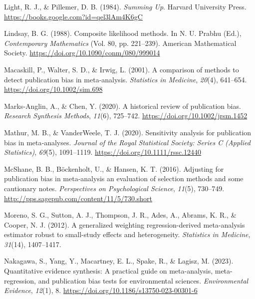 \documentclass[
  american,
  man, donotrepeattitle,floatsintext]{apa7}
\newlength{\cslhangindent}
\newenvironment{CSLReferences}[2] %
 {\begin{list}{}{%
  \setlength{\itemindent}{0pt}
  \setlength{\leftmargin}{0pt}
  \setlength{\parsep}{0pt}
  \ifodd #1
   \setlength{\leftmargin}{\cslhangindent}
   \setlength{\itemindent}{-1\cslhangindent}
  \fi
  \setlength{\itemsep}{#2\baselineskip}}}
 {\end{list}}
\begin{document}
\begin{CSLReferences}{1}{0}
Light, R. J., \& Pillemer, D. B. (1984). \emph{Summing {Up}}. {Harvard University Press}. \url{https://books.google.com?id=qel3lAm4K6gC}

Lindsay, B. G. (1988). Composite likelihood methods. In N. U. Prabhu (Ed.), \emph{Contemporary {Mathematics}} (Vol. 80, pp. 221--239). American Mathematical Society. \url{https://doi.org/10.1090/conm/080/999014}

Macaskill, P., Walter, S. D., \& Irwig, L. (2001). A comparison of methods to detect publication bias in meta-analysis. \emph{Statistics in Medicine}, \emph{20}(4), 641--654. \url{https://doi.org/10.1002/sim.698}

Marks‐Anglin, A., \& Chen, Y. (2020). A historical review of publication bias. \emph{Research Synthesis Methods}, \emph{11}(6), 725--742. \url{https://doi.org/10.1002/jrsm.1452}

Mathur, M. B., \& VanderWeele, T. J. (2020). Sensitivity analysis for publication bias in meta‐analyses. \emph{Journal of the Royal Statistical Society: Series C (Applied Statistics)}, \emph{69}(5), 1091--1119. \url{https://doi.org/10.1111/rssc.12440}

McShane, B. B., Böckenholt, U., \& Hansen, K. T. (2016). Adjusting for publication bias in meta-analysis an evaluation of selection methods and some cautionary notes. \emph{Perspectives on Psychological Science}, \emph{11}(5), 730--749. \url{http://pps.sagepub.com/content/11/5/730.short}

Moreno, S. G., Sutton, A. J., Thompson, J. R., Ades, A., Abrams, K. R., \& Cooper, N. J. (2012). A generalized weighting regression-derived meta-analysis estimator robust to small-study effects and heterogeneity. \emph{Statistics in Medicine}, \emph{31}(14), 1407--1417.

Nakagawa, S., Yang, Y., Macartney, E. L., Spake, R., \& Lagisz, M. (2023). Quantitative evidence synthesis: A practical guide on meta-analysis, meta-regression, and publication bias tests for environmental sciences. \emph{Environmental Evidence}, \emph{12}(1), 8. \url{https://doi.org/10.1186/s13750-023-00301-6}


\end{CSLReferences}
\end{document}
